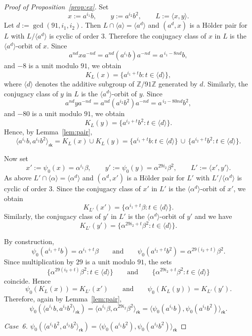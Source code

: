 \documentclass[a4paper,12pt]{article}
\theoremstyle{definition}
\theoremstyle{remark}
\begin{document}
\begin{proof}[Proof of Proposition~\ref{prop:ex}]
  \medskip
  Set
  $$ x:=a^{i_1}b,\qquad y:=a^{i_2}b^2,\qquad L:=\langle x,y\rangle. $$
  Let $d:=\gcd(91,i_1,i_2)$. Then $L\cap \langle a\rangle = \langle a^d\rangle$ and $(a^d,x)$ is a Hölder pair for $L$ with $L/\langle a^d\rangle$ is cyclic of order $3$. Therefore the conjugacy class of $x$ in $L$ is the $\langle a^d\rangle$-orbit of $x$. Since
  $$ a^{nd}xa^{-nd}=a^{nd}(a^{i_1}b)a^{-nd}=a^{\,i_1-8nd}b, $$
  and $-8$ is a unit modulo $91$, we obtain
  $$ K_L(x)=\{a^{i_1+t}b : t\in \langle d\rangle\}, $$
  where $\langle d\rangle$ denotes the additive subgroup of $\mathbb{Z}/91\mathbb{Z}$
  generated by $d$. Similarly, the conjugacy class of $y$ in $L$ is the $\langle a^d\rangle$-orbit of $y$. Since
  $$ a^{nd}ya^{-nd}=a^{nd}(a^{i_2}b^2)a^{-nd}=a^{\,i_2-80nd}b^2, $$
  and $-80$ is a unit modulo $91$, we obtain
  $$ K_L(y)=\{a^{i_2+t}b^2 : t\in \langle d\rangle\}. $$
  Hence, by Lemma~\ref{lem:pair},
  $$ \langle a^{i_1}b,a^{i_2}b^2\rangle_{\mathsf{rk}} = K_L(x)\cup K_L(y) = \{a^{i_1+t}b : t\in \langle d\rangle\} \,\cup\, \{a^{i_2+t}b^2 : t\in \langle d\rangle\}. $$
  
  Now set
  $$ x':=\psi_0(x)=\alpha^{i_1}\beta,\qquad y':=\psi_0(y)=\alpha^{29i_2}\beta^2,\qquad L':=\langle x',y'\rangle. $$
  As above $L'\cap \langle \alpha\rangle=\langle \alpha^d\rangle$ and $(\alpha^d,x')$ is a Hölder pair for $L'$ with $L'/\langle\alpha^d \rangle$ is cyclic of order $3$. Since the conjugacy class of $x'$ in $L'$ is the $\langle \alpha^d\rangle$-orbit of $x'$, we obtain
  $$
  K_{L'}(x')=\{\alpha^{i_1+t}\beta : t\in \langle d\rangle\}.
  $$
  Similarly, the conjugacy class of $y'$ in $L'$ is the $\langle \alpha^d\rangle$-orbit of $y'$ and we have
  $$ K_{L'}(y')=\{\alpha^{29i_2+t}\beta^2 : t\in \langle d\rangle\}. $$
  
  By construction,
  $$ \psi_0(a^{i_1+t}b)=\alpha^{i_1+t}\beta \qquad\text{and}\qquad \psi_0(a^{i_2+t}b^2)=\alpha^{29(i_2+t)}\beta^2. $$
  Since multiplication by $29$ is a unit modulo $91$, the sets
  $$ \{\alpha^{29(i_2+t)}\beta^2:t\in \langle d\rangle\} \qquad\text{and}\qquad \{\alpha^{29i_2+t}\beta^2:t\in \langle d\rangle\} $$
  coincide. Hence
  $$ \psi_0(K_L(x))=K_{L'}(x') \qquad\text{and}\qquad \psi_0(K_L(y))=K_{L'}(y'). $$
  Therefore, again by Lemma~\ref{lem:pair},
  $$ \psi_0(\langle a^{i_1}b,a^{i_2}b^2\rangle_{\mathsf{rk}}) = \langle \alpha^{i_1}\beta,\alpha^{29i_2}\beta^2\rangle_{\mathsf{rk}} = \langle \psi_0(a^{i_1}b),\psi_0(a^{i_2}b^2)\rangle_{\mathsf{rk}}. $$
  
  
  
  \medskip
  \noindent
  \emph{Case~6.\; $\psi_0(\langle a^{i_1}b^2,a^{i_2}b^2\rangle_{\mathsf{rk}})
    =\langle \psi_0(a^{i_1}b^2),\psi_0(a^{i_2}b^2)\rangle_{\mathsf{rk}}$}
  

\end{proof}
\end{document}
